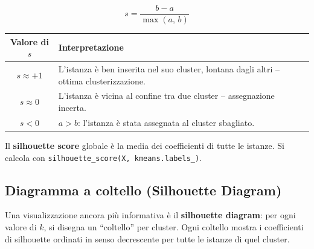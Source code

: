 \begin{equation}
s = \frac{b - a}{\max(a,\, b)}
\end{equation}

\begin{center}
\renewcommand{\arraystretch}{1.3}
\begin{tabular}{@{} c p{14cm} @{}}
\toprule
\textbf{Valore di $s$} & \textbf{Interpretazione} \\
\midrule
$s \approx +1$ & L'istanza è ben inserita nel suo cluster, lontana dagli altri -- ottima clusterizzazione. \\
$s \approx 0$ & L'istanza è vicina al confine tra due cluster -- assegnazione incerta. \\
$s < 0$ & $a > b$: l'istanza è stata assegnata al cluster sbagliato. \\
\bottomrule
\end{tabular}
\end{center}

Il \textbf{silhouette score} globale è la media dei coefficienti di tutte le istanze. Si calcola con \texttt{silhouette\_score(X, kmeans.labels\_)}.

\begin{center}
\end{center}

\subsection{Diagramma a coltello (Silhouette Diagram)}

Una visualizzazione ancora più informativa è il \textbf{silhouette diagram}: per ogni valore di $k$, si disegna un ``coltello'' per cluster. Ogni coltello mostra i coefficienti di silhouette ordinati in senso decrescente per tutte le istanze di quel cluster.

